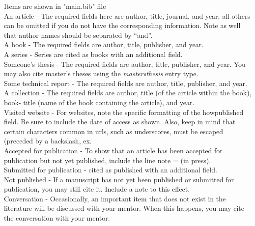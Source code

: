 Items are shown in "main.bib" file\\

\noindent An article \cite{anarticle} - The required fields here are author, title, journal, and year; all others can be omitted if you do not have the corresponding information. Note as well that author names should be separated by “and”.\\
A book \cite{abook} - The required fields are author, title, publisher, and year.\\
A series \cite{bookseries} - Series are cited as books with an additional field.\\
Someone's thesis \cite{thesis} - The required fields are author, title, publisher, and year. You may also
cite master’s theses using the \textit{mastersthesis} entry type.\\
Some technical report \cite{report} - The required fields are author, title, publisher, and year.\\
A collection \cite{collection} - The required fields are author, title (of the article within the book), book-
title (name of the book containing the article), and year.\\
Visited website \cite{website} - For websites, note the specific formatting of the howpublished field. Be
sure to include the date of access as shown. Also, keep in mind that certain
characters common in urls, such as underscores, must be escaped (preceded
by a backslash, ex.\\
Accepted for publication \cite{acceptedpub} - To show that an article has been accepted for publication but not yet
published, include the line note = {(in press)}.\\
Submitted for publication \cite{unpub} - cited as published with an additional field.\\
Not published \cite{notpub} - If a manuscript has not yet been published or submitted for publication,
you may still cite it. Include a note to this effect.\\
Conversation \cite{conv} - Occasionally, an important item that does not exist in the literature will
be discussed with your mentor. When this happens, you may cite the conversation with your mentor.